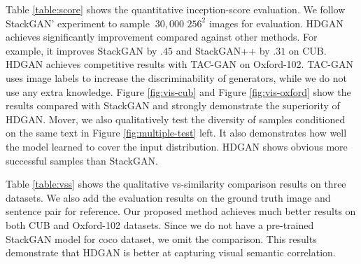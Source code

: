 \documentclass[10pt,twocolumn,letterpaper]{article}
\begin{document}
Table \ref{table:score} shows the quantitative inception-score evaluation. We follow StackGAN' experiment to sample ${~}30,000$ $256^2$ images for evaluation.
HDGAN achieves significantly improvement compared against other methods. For example, it improves StackGAN by $.45$ and StackGAN++ by $.31$ on CUB.
HDGAN achieves competitive results with TAC-GAN on Oxford-102. TAC-GAN uses image labels to increase the discriminability of generators, while we do not use any extra knowledge. Figure \ref{fig:vis-cub} and Figure \ref{fig:vis-oxford} show the results compared with StackGAN and strongly demonstrate the superiority of HDGAN. Mover, we also qualitatively test the diversity of samples conditioned on the same text in Figure \ref{fig:multiple-test} left. It also demonstrates how well the model learned to cover the input distribution. HDGAN shows obvious more successful samples than StackGAN.

Table \ref{table:vss} shows the qualitative vs-similarity comparison results on three datasets. We also add the evaluation results on the ground truth image and sentence pair for reference. Our proposed method achieves much better results on both CUB and Oxford-102 datasets. Since we do not have a pre-trained  StackGAN model for coco dataset, we omit the comparison. This results demonstrate that HDGAN is better at capturing visual semantic correlation.

\end{document}
